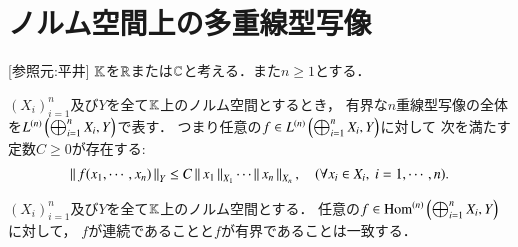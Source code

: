 \section{ノルム空間上の多重線型写像}
	[参照元:平井\cite{key7}]
	$\K$を$\R$または$\C$と考える．また$n \geq 1$とする．
	\begin{screen}
		\begin{dfn}[有界な多重線型写像]
			$(X_i)_{i=1}^n$及び$Y$を全て$\K$上のノルム空間とするとき，
			有界な$n$重線型写像の全体を$\ContLn{\bigoplus_{i=1}^n X_i}{Y}{n}$で表す．
			つまり任意の$f \in \ContLn{\bigoplus_{i=1}^n X_i}{Y}{n}$に対して
			次を満たす定数$C \geq 0$が存在する:
			\begin{align}
				\Norm{f(x_1,\cdots,x_n)}{Y} \leq C \Norm{x_1}{X_1}\cdots\Norm{x_n}{X_n},
				\quad (\forall x_i \in X_i,\ i=1,\cdots,n).
				\label{eq:def_bounced_multilinear_mapping}
			\end{align}
		\end{dfn}
	\end{screen}
	
	\begin{screen}
		\begin{thm}[有界$\Leftrightarrow$連続]
			$(X_i)_{i=1}^n$及び$Y$を全て$\K$上のノルム空間とする．
			任意の$f \in \Ln{\bigoplus_{i=1}^n X_i}{Y}{n}$に対して，
			$f$が連続であることと$f$が有界であることは一致する．
		\end{thm}
	\end{screen}
	
